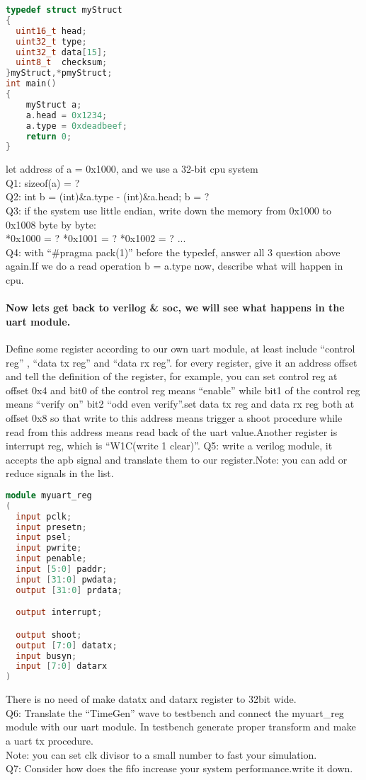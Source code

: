 \documentclass{article}
\begin{document}
\begin{lstlisting}[language=c]
typedef struct myStruct
{
  uint16_t head;
  uint32_t type;
  uint32_t data[15];
  uint8_t  checksum;
}myStruct,*pmyStruct;
int main()
{
	myStruct a;
	a.head = 0x1234;
	a.type = 0xdeadbeef;
    return 0;
}
\end{lstlisting}

let address of a = 0x1000, and we use a 32-bit cpu system\\
Q1: sizeof(a) = ?\\
Q2: int b = (int)\&a.type - (int)\&a.head; b = ?\\
Q3: if the system use little endian, write down the memory from 0x1000 to 0x1008 byte by byte:\\
*0x1000 = ? *0x1001 = ? *0x1002 = ? ...\\
Q4: with ``\#pragma pack(1)'' before the typedef, answer all 3 question above again.If we do a read operation
b = a.type now, describe what will happen in cpu.\\
\paragraph{Now lets get back to verilog \& soc, we will see what happens in the uart module.\\}
Define some register according to our own uart module, at least include ``control reg'' , ``data tx reg'' and ``data rx reg''.
for every register, give it an address offset and tell the definition of the register, for example, you can set control reg at offset 0x4
and bit0 of the control reg means ``enable'' while bit1 of the control reg means ``verify on'' bit2 ``odd even verify''.set data tx reg
and data rx reg both at offset 0x8 so that write to this address means trigger a shoot procedure while read from this address means read back
of the uart value.Another register is interrupt reg, which is ``W1C(write 1 clear)''.
Q5: write a verilog module, it accepts the apb signal and translate them to our register.Note: you can add or reduce signals in the list.
\begin{lstlisting}[language=verilog]
module myuart_reg
(
  input pclk;
  input presetn;
  input psel;
  input pwrite;
  input penable;
  input [5:0] paddr;
  input [31:0] pwdata;
  output [31:0] prdata;

  output interrupt;

  output shoot;
  output [7:0] datatx;
  input busyn;
  input [7:0] datarx
)
\end{lstlisting}
There is no need of make datatx and datarx register to 32bit wide.\\
Q6: Translate the ``TimeGen'' wave to testbench and connect the myuart\_reg module with our uart module.
In testbench generate proper transform and make a uart tx procedure.\\
Note: you can set clk divisor to a small number to fast your simulation.\\
Q7: Consider how does the fifo increase your system performance.write it down.
\end{document}
